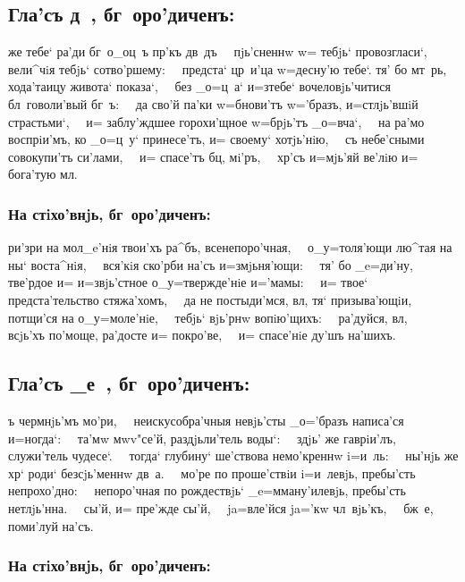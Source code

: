 \documentclass[14pt,twoside]{extreport}
\renewcommand{\*}{~~\raise3pt\hbox{\footnotesize*}}
\begin{document}
\delimpict

\subsection[Гла'съ д~]{Гла'съ д~, бг~оро'диченъ:}

же тебе` ра'ди бг~о{_о}ц~ъ пр'къ дв~дъ\* пjь'сненнw w=
тебjь` провозгласи`,\* вели^чiя тебjь` со\-тво'р\-ше\-му:\* предста` цр~и'ца
w=десну'ю тебе`. тя' бо мт~рь, хода'таицу живота` показа`,\* без\ъ
_о=ц~а` и=з\ъ тебе` вочеловjь'читися бл~говоли'вый бг~ъ:\* да сво'й
па'ки w=бнови'тъ w='бразъ, и=стлjь'вшiй страстьми`,\* и= заблу'ждшее
горохи'щное w=брjь'тъ _о=вча`,\* на ра'мо воспрiи'мъ, ко _о=ц~у`
принесе'тъ, и= своему` хотjь'нiю,\* съ небе'сными совокупи'тъ
си'лами,\* и= спасе'тъ бц, мi'ръ,\* хр'съ и=мjь'яй ве'лiю и=
бога'тую мл.

\subsubsection{На стiхо'внjь, бг~оро'диченъ:}

ри'зри на мол_e'нiя твои'хъ ра^бъ, все\-не\-по\-ро'ч\-ная,\*
о_у=толя'ющи лю^тая на ны` воста^нiя,\* вся'кiя ско'рби на'съ
и=змjьня'ющи:\* тя' бо _e=ди'ну, тве'рдое и= и=звjь'стное
о_у=твержде'нiе и='мамы:\* и= твое` предста'тельство стяжа'хомъ,\* да
не постыди'мся, вл, тя` призыва'ющiи,\* потщи'ся на
о_у=моле'нiе,\* тебjь` вjь'рнw вопiю'щихъ:\* ра'\-дуй\-ся, вл,\*
всjь'хъ по'моще, ра'досте и= покро'ве,\* и= спасе'нiе ду'шъ на'шихъ.

\delimpict

\subsection[Гла'съ _е~]{Гла'съ _е~, бг~оро'диченъ:}

ъ чермнjь'мъ мо'ри,\* неискусобра'чныя невjь'сты _о='бразъ
написа'ся и=ногда`:\* та'мw мwv"се'й, раздjьли'тель воды`:\* здjь' же
гаврiи'лъ, служи'тель чудесе`.\* тогда` глубину` ше'ствова немо'креннw
i=и~ль:\* ны'нjь же хр` роди` безсjь'меннw дв~а.\* мо'ре по
проше'ствiи i=и~левjь, пребы'сть непрохо'дно:\* непоро'чная по
рождествjь` _e=мману'илевjь, пребы'сть нетлjь'нна.\* сы'й, и= пре'жде
сы'й,\* ja=вле'йся ja='кw чл~вjь'къ,\* бж~е, поми'луй на'съ.

\subsubsection{На стiхо'внjь, бг~оро'диченъ:}
\end{document}
